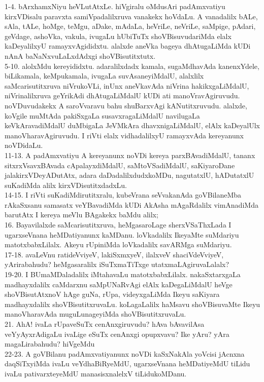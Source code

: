 \documentclass{article}
\begin{document}
1-4. bArxhamxNiyu heVLutAtxLe. hiVgiralu oMdusAri padAmxvatiyu kirxVDisalu paravxta samiVpadalilxruva vanakekx hoVdaLu. A vanadalilx bALe, sAla, tALe, hoMge, teMgu, aDake, mAdaLa, heVriLe, neVriLe, saMpige, pAdari, geVdage, ashoVka, vakula, ivugaLu hUbiTuTx shoVBisuvudariMda elalx kaDeyalilxyU ramayxvAgididxtu. alalxde aneVka bageya dhAtugaLiMda kUDi nAnA baNaNxvuLaLxdAdxgi shoVBisutitxtutx.\\
5-10. alolxMdu kereyididxtu. adaralilxdadx kamala, sugaMdhavAda kanenxYdele, biLikamala, keMpukamala, ivugaLa suvAsaneyiMdalU, alalxlilx saMcarisutitxruva niVrukoVLi, inUnx aneVkavAda niVrina hakikxgaLiMdalU, niVrinalilxruva geYrikAdi dhAtugaLiMdalU kUDi ati manoVravAgiruvudu. noVDuvudakekx A saroVvaravu bahu shuBarxvAgi kANutitxruvudu. alalxde, koVgile muMtAda pakiSxgaLa susavxragaLiMdalU navilugaLa keVkAravadiMdalU duMbigaLa JeVMkAra dhavxnigaLiMdalU, elAlx kaDeyalUlx manoVharavAgiruvudu. I riVti elalx vidhadalilxyU ramayxvAda kereyanunx noVDidaLu.\\
11-13. A padAmxvatiyu A kereyanunx noVDi kereya parxBAvadiMdalU, tananx sitxrxVsavxBAvada cApalayxdiMdalU, saMtoVSadiMdalU, saKiyaroDane jalakirxVDeyADutAtx, adara daDadalilxdudxkoMDu, nagutatxlU, hADutatxlU suKadiMda alilx kirxVDisutitxdadxLu.\\
14-15. I riVti suKadiMdirutitxralu, kubeVrana seVvakanAda goVBilaneMba rAkaSxsanu samasatx veYBavadiMda kUDi AkAsha mAgaRdalilx vimAnadiMda barutAtx I kereya meVlu BAgakekx baMdu alilx;\\
16. Bayavilalxde saMcarisutitxruva, heMgasaroLage sherxVSaThxLada I ugarxseVnana heMDatiyanunx kaMDanu. loVkadalilx IkeyaMte suMdariyu matotxbabxLilalx. Akeyu rUpiniMda loVkadalilx savARMga suMdariyu.\\
17-18. avaLeVnu ratideVviyeV, lakiSxmxyeV, ilalxveV shaciVdeVviyeV, yArirabahudu? heMgasaralilx iSuTxmaTiTxge utatxmaLAgiruvaLalalx?\\
19-20. I BUmaMDaladalilx iMtahavaLu matotxbabxLilalx. nakaSxtarxgaLa madhayxdalilx caMdarxnu saMpUNaRvAgi elAlx kaDegaLiMdalU heVge shoVBisutAtxnoV hAge guNa, rUpa, videyxgaLiMda Ikeyu saKiyara madhayxdalilx shoVBisutitxruvaLu. koLagaLalilx haMsavu shoVBisuvaMte Ikeyu manoVharavAda muguLunageyiMda shoVBisutitxruvaLu.\\
21. AhA! ivaLa rUpaveSuTx cenAnxgiruvudu? hAva bAvavilAsa veYyAyxrAdigaLu ivaLige eSuTx cenAnxgi opupxvavu? Ike yAru? yAra magaLirabahudu? hiVgeMdu\\
22-23. A goVBilanu padAmxvatiyanunx noVDi kaSxNakAla yoVcisi jAcnxna daqSiTxyiMda ivaLu veYdhaBiRyeMdU, ugarxseVnana heMDatiyeMdU tiLidu ivaLu pativarxteyeMdU manasisxnalelxV tiLidukoMDanu.\\
\end{document}

